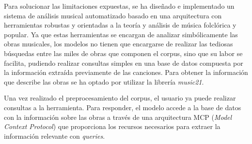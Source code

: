 
Para solucionar las limitaciones expuestas, se ha diseñado e implementado un sistema de análisis musical automatizado basado en una arquitectura con herramientas robustas y orientadas a la teoría y análisis de música folclórica y popular. Ya que estas herramientas se encargan de analizar simbólicamente las obras musicales, los modelos no tienen que encargarse de realizar las tediosas búsquedas entre las miles de obras que componen el corpus, sino que su labor se facilita, pudiendo realizar consultas simples en una base de datos compuesta por la información extraída previamente de las canciones. Para obtener la información que describe las obras se ha optado por utilizar la librería \textit{music21}.

Una vez realizado el preprocesamiento del corpus, el usuario ya puede realizar consultas a la herramienta. Para responder, el modelo accede a la base de datos con la información sobre las obras a través de una arquitectura MCP (\textit{Model Context Protocol}) que proporciona los recursos necesarios para extraer la información relevante con \textit{queries}.

